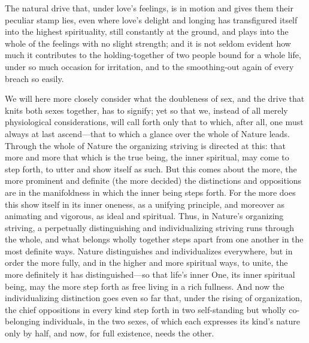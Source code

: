 \documentclass[12pt,a4paper]{book}
\begin{document}
The natural drive that, under love's feelings, is in motion and gives them
their peculiar stamp lies, even where love's delight and longing has
transfigured itself into the highest spirituality, still constantly at the
ground, and plays into the whole of the feelings with no slight strength;
and it is not seldom evident how much it contributes to the
holding-together of two people bound for a whole life, under so much
occasion for irritation, and to the smoothing-out again of every breach so
easily.

We will here more closely consider what the doubleness of sex, and the
drive that knits both sexes together, has to signify; yet so that we,
instead of all merely physiological considerations, will call forth only
that to which, after all, one must always at last ascend---that to which a
glance over the whole of Nature leads.
Through the whole of Nature the organizing striving is directed at this:
that more and more that which is the true being, the inner spiritual, may
come to step forth, to utter and show itself as such. But this comes about
the more, the more prominent and definite (the more decided) the
distinctions and oppositions are in the manifoldness in which the inner
being steps forth. For the more does this show itself in its inner oneness,
as a unifying principle, and moreover as animating and vigorous, as ideal
and spiritual. Thus, in Nature's organizing striving, a perpetually
distinguishing and individualizing striving runs through the whole, and
what belongs wholly together steps apart from one another in the most
definite ways. Nature distinguishes and individualizes everywhere, but in
order the more fully, and in the higher and more spiritual ways, to unite,
the more definitely it has distinguished---so that life's inner One, its
inner spiritual being, may the more step forth as free living in a rich
fullness. And now the individualizing distinction goes even so far that,
under the rising of organization, the chief oppositions in every kind step
forth in two self-standing but wholly co-belonging individuals, in the two
sexes, of which each expresses its kind's nature only by half, and now, for
full existence, needs the other.
\end{document}
